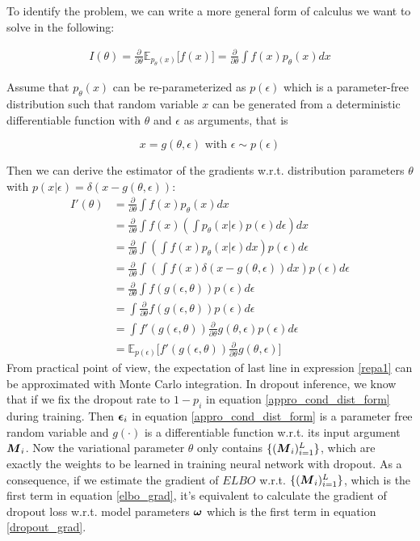To identify the problem, we can write a more general form of calculus we want to solve in the following:

\begin{equation}
\begin{aligned} \label{repa}
I(\theta) = \frac{\partial}{\partial \theta} \mathbb E_{p_{\theta}(x)} \big[ f(x)\big]= \frac{\partial}{\partial \theta} \int f(x) p_{\theta}(x) dx
\end{aligned}
\end{equation} 

Assume that $p_{\theta}(x)$ can be re-parameterized as $p(\epsilon)$ which is a parameter-free distribution such that random variable $x$ can be generated from a deterministic differentiable function with $\theta$ and $\epsilon$ as arguments, that is

\[
x = g(\theta, \epsilon)  \text{ with } \epsilon \sim p(\epsilon)
\]

Then we can derive the estimator of the gradients w.r.t. distribution parameters $\theta$ with $p(x|\epsilon) = \delta(x-g(\theta,\epsilon))$:
\begin{equation}
\begin{aligned} \label{repa1}
I'(\theta) &= \frac{\partial}{\partial \theta} \int f(x) p_{\theta}(x) dx \\
&= \frac{\partial}{\partial \theta} \int f(x)(\int p_{\theta}(x|\epsilon)p(\epsilon)d\epsilon) dx \\
&= \frac{\partial}{\partial \theta} \int (\int f(x) p_{\theta}(x|\epsilon)dx) p(\epsilon) d\epsilon \\
&= \frac{\partial}{\partial \theta} \int (\int f(x)\delta(x-g(\theta,\epsilon))dx) p(\epsilon) d\epsilon \\ 
&= \frac{\partial}{\partial \theta} \int f(g(\epsilon, \theta)) p(\epsilon) d\epsilon \\
&= \int \frac{\partial}{\partial \theta} f(g(\epsilon, \theta)) p(\epsilon) d\epsilon \\
&= \int f'(g(\epsilon, \theta))\frac{\partial}{\partial \theta}g(\theta, \epsilon) p(\epsilon) d\epsilon \\
&= \mathbb E_{p(\epsilon)}\big[ f'(g(\epsilon, \theta))\frac{\partial}{\partial \theta}g(\theta, \epsilon)\big] 
\end{aligned}
\end{equation} 
From practical point of view, the expectation of last line in expression \ref{repa1} can be approximated with Monte Carlo integration. In dropout inference, we know that if we fix the dropout rate to $1- p_{i}$ in equation \ref{appro_cond_dist_form} during training. Then $\boldsymbol \epsilon_{i}$ in equation \ref{appro_cond_dist_form} is a parameter free random variable and $g(\cdot)$ is a differentiable function w.r.t. its input argument $\boldsymbol M_{i}$. Now the variational parameter $\theta$ only contains $\{(\boldsymbol M_{i})_{i=1}^{L} \}$, which are exactly the weights to be learned in training neural network with dropout. As a consequence, if we estimate the gradient of $ELBO$ w.r.t. $\{(\boldsymbol M_{i})_{i=1}^{L}\}$, which is the first term in equation \ref{elbo_grad}, it's equivalent to calculate the gradient of dropout loss w.r.t. model parameters $\boldsymbol \omega$ which is the first term in equation \ref{dropout_grad}.

